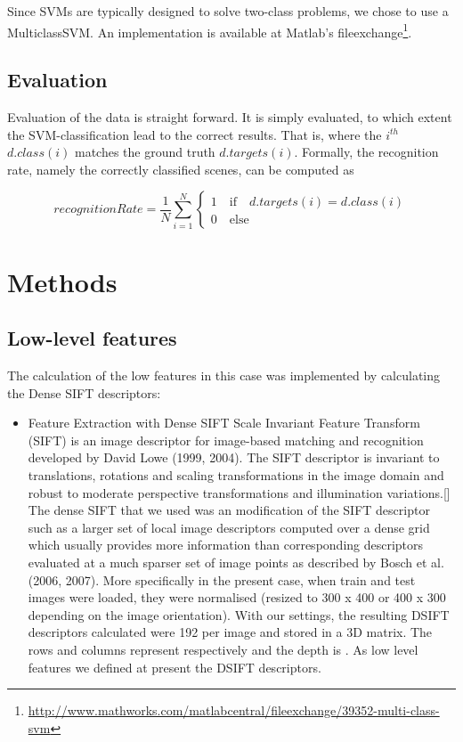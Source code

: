 \documentclass[10pt,twocolumn,letterpaper]{article}
\begin{document}
Since SVMs are typically designed to solve two-class problems, we chose to use a MulticlassSVM. An implementation is available at Matlab's fileexchange\footnote{\url{http://www.mathworks.com/matlabcentral/fileexchange/39352-multi-class-svm}}. 

\subsection{Evaluation}
\label{sec:eval}
Evaluation of the data is straight forward. It is simply evaluated, to which extent the SVM-classification lead to the correct results. That is, where the $i^{th}$ $d.class(i)$ matches the ground truth $d.targets(i)$. Formally, the recognition rate, namely the correctly classified scenes, can be computed as 
\begin{small}

\begin{equation}
	recognitionRate = \frac{1}{N} \sum_{i=1}^{N} \begin{cases}
	1 \quad \text{if} \quad d.targets(i) = d.class(i)\\
	0  \quad \text{else}
	\end{cases}
\end{equation}
\end{small}




\section{Methods}

\subsection{Low-level features}
The calculation of the low features in this case  was implemented by calculating the Dense SIFT descriptors:
\begin{itemize}
   \item Feature Extraction with Dense SIFT \newline
   Scale Invariant Feature Transform (SIFT) is an image descriptor for image-based matching and recognition developed by David Lowe (1999, 2004). The SIFT descriptor is invariant to translations, rotations and scaling transformations in the image domain and robust to moderate perspective transformations and illumination variations.[] The dense SIFT that we used was an modification of the SIFT descriptor such as a larger set of local image descriptors computed over a dense grid which usually provides more information than corresponding descriptors evaluated at a much sparser set of image points as described by Bosch et al. (2006, 2007). More specifically in the present case, when train and test images were loaded, they were normalised (resized to 300 x 400 or 400 x 300 depending on the image orientation). With our settings, the resulting DSIFT descriptors calculated were 192 per image and stored in a 3D matrix. The rows and columns represent respectively and the depth is  .  As low level features we defined at present the DSIFT descriptors.
\end{itemize}
\end{document}
